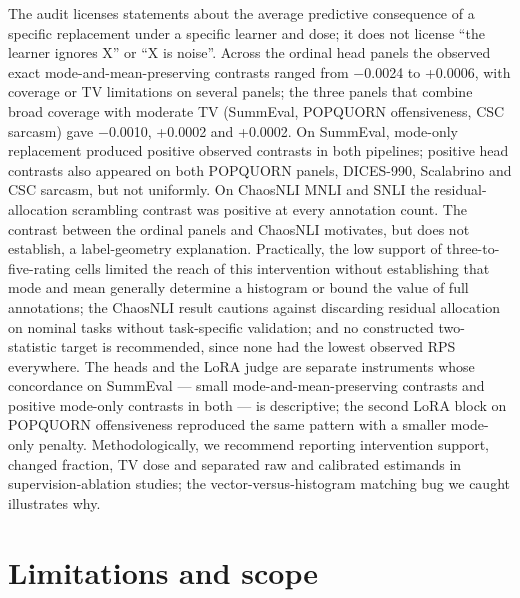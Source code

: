 \documentclass[10pt]{article}
\begin{document}
The audit licenses statements about the average predictive consequence of a specific replacement under a specific learner and dose; it does not license ``the learner ignores X'' or ``X is noise''. Across the ordinal head panels the observed exact mode-and-mean-preserving contrasts ranged from $-$0.0024 to +0.0006, with coverage or TV limitations on several panels; the three panels that combine broad coverage with moderate TV (SummEval, POPQUORN offensiveness, CSC sarcasm) gave $-$0.0010, +0.0002 and +0.0002. On SummEval, mode-only replacement produced positive observed contrasts in both pipelines; positive head contrasts also appeared on both POPQUORN panels, DICES-990, Scalabrino and CSC sarcasm, but not uniformly. On ChaosNLI MNLI and SNLI the residual-allocation scrambling contrast was positive at every annotation count. The contrast between the ordinal panels and ChaosNLI motivates, but does not establish, a label-geometry explanation. Practically, the low support of three-to-five-rating cells limited the reach of this intervention without establishing that mode and mean generally determine a histogram or bound the value of full annotations; the ChaosNLI result cautions against discarding residual allocation on nominal tasks without task-specific validation; and no constructed two-statistic target is recommended, since none had the lowest observed RPS everywhere. The heads and the LoRA judge are separate instruments whose concordance on SummEval --- small mode-and-mean-preserving contrasts and positive mode-only contrasts in both --- is descriptive; the second LoRA block on POPQUORN offensiveness reproduced the same pattern with a smaller mode-only penalty. Methodologically, we recommend reporting intervention support, changed fraction, TV dose and separated raw and calibrated estimands in supervision-ablation studies; the vector-versus-histogram matching bug we caught illustrates why.

\section{Limitations and scope}
\end{document}
